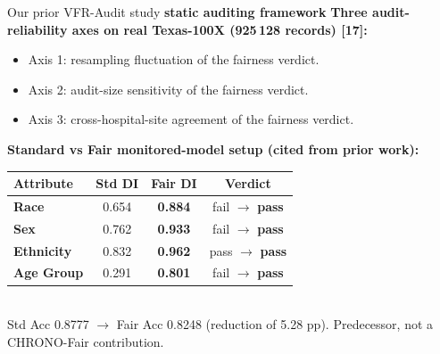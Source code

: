 \documentclass[aspectratio=169,11pt]{beamer}
\newcommand{\chip}[2][amber]{%
  \begingroup\setlength{\fboxsep}{4pt}%
  \colorbox{#1}{\color{ink}\bfseries\small #2}\endgroup}
\begin{document}
\begin{frame}{Our prior VFR-Audit study \hfill \chip[soft]{static auditing framework}}
\vspace{2pt}
\textbf{Three audit-reliability axes on real Texas-100X (925\,128 records) [17]:}
\vspace{2pt}
\begin{itemize}
\setlength\itemsep{0pt}
\item[\faIcon{circle-notch}] Axis 1: resampling fluctuation of the fairness verdict.
\item[\faIcon{compress-arrows-alt}] Axis 2: audit-size sensitivity of the fairness verdict.
\item[\faIcon{hospital}] Axis 3: cross-hospital-site agreement of the fairness verdict.
\end{itemize}
\vspace{4pt}
\textbf{Standard vs Fair monitored-model setup (cited from prior work):}
\vspace{2pt}
\centering
\small
\setlength{\arrayrulewidth}{0.8pt}
\begin{tabular}{>{\bfseries}l c c c}
\toprule
\rowcolor{ink}
{\color{paper}\textbf{Attribute}} & {\color{paper}\textbf{Std DI}} & {\color{paper}\textbf{Fair DI}} & {\color{paper}\textbf{Verdict}} \\
\midrule
Race      & 0.654 & \cellcolor{soft}\textbf{0.884} & \color{coral}fail $\rightarrow$ \color{emerald}\textbf{pass} \\
Sex       & 0.762 & \cellcolor{soft}\textbf{0.933} & \color{coral}fail $\rightarrow$ \color{emerald}\textbf{pass} \\
Ethnicity & 0.832 & \cellcolor{soft}\textbf{0.962} & \color{emerald}pass $\rightarrow$ \color{emerald}\textbf{pass} \\
Age Group & 0.291 & \cellcolor{soft}\textbf{0.801} & \color{coral}fail $\rightarrow$ \color{emerald}\textbf{pass} \\
\bottomrule
\end{tabular}
\vspace{2pt}\\
{\footnotesize\color{muted} Std Acc 0.8777 $\rightarrow$ Fair Acc 0.8248 (reduction of 5.28 pp). Predecessor, not a CHRONO-Fair contribution.}
\end{frame}
\end{document}

